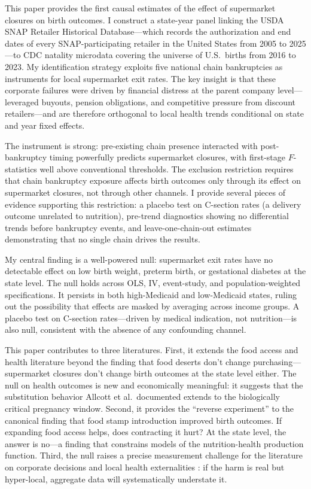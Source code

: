 \documentclass[12pt]{article}
\begin{document}
This paper provides the first causal estimates of the effect of supermarket closures on birth outcomes. I construct a state-year panel linking the USDA SNAP Retailer Historical Database---which records the authorization and end dates of every SNAP-participating retailer in the United States from 2005 to 2025---to CDC natality microdata covering the universe of U.S.\ births from 2016 to 2023. My identification strategy exploits five national chain bankruptcies as instruments for local supermarket exit rates. The key insight is that these corporate failures were driven by financial distress at the parent company level---leveraged buyouts, pension obligations, and competitive pressure from discount retailers---and are therefore orthogonal to local health trends conditional on state and year fixed effects.

The instrument is strong: pre-existing chain presence interacted with post-bankruptcy timing powerfully predicts supermarket closures, with first-stage $F$-statistics well above conventional thresholds. The exclusion restriction requires that chain bankruptcy exposure affects birth outcomes only through its effect on supermarket closures, not through other channels. I provide several pieces of evidence supporting this restriction: a placebo test on C-section rates (a delivery outcome unrelated to nutrition), pre-trend diagnostics showing no differential trends before bankruptcy events, and leave-one-chain-out estimates demonstrating that no single chain drives the results.

My central finding is a well-powered null: supermarket exit rates have no detectable effect on low birth weight, preterm birth, or gestational diabetes at the state level. The null holds across OLS, IV, event-study, and population-weighted specifications. It persists in both high-Medicaid and low-Medicaid states, ruling out the possibility that effects are masked by averaging across income groups. A placebo test on C-section rates---driven by medical indication, not nutrition---is also null, consistent with the absence of any confounding channel.

This paper contributes to three literatures. First, it extends the food access and health literature beyond the \citet{allcott2019food} finding that food deserts don't change purchasing---supermarket closures don't change birth outcomes at the state level either. The null on health outcomes is new and economically meaningful: it suggests that the substitution behavior Allcott et al.\ documented extends to the biologically critical pregnancy window. Second, it provides the ``reverse experiment'' to the canonical \citet{hoynes2011can} finding that food stamp introduction improved birth outcomes. If expanding food access helps, does contracting it hurt? At the state level, the answer is no---a finding that constrains models of the nutrition-health production function. Third, the null raises a precise measurement challenge for the literature on corporate decisions and local health externalities \citep{currie2020something, sullivan2009job, buchmueller2006effect}: if the harm is real but hyper-local, aggregate data will systematically understate it.
\end{document}
